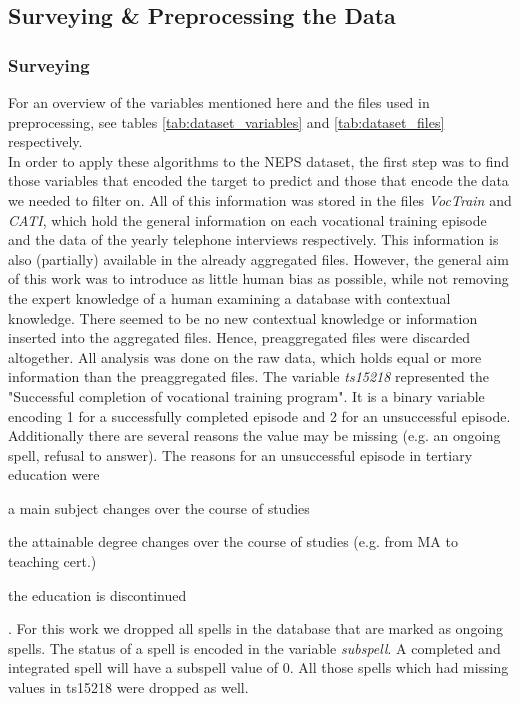 \FloatBarrier
\subsection{Surveying \& Preprocessing the Data}
\FloatBarrier
\label{sec:preprocessing}
\subsubsection{Surveying}

For an overview of the variables mentioned here and the files used in preprocessing, see tables \ref{tab:dataset_variables} and \ref{tab:dataset_files} respectively.\\
In order to apply these algorithms to the NEPS dataset, the first step was to find those variables that encoded the target to predict and those that encode the data we needed to filter on. All of this information was stored in the files \textit{VocTrain} and \textit{CATI}, which hold the general information on each vocational training episode and the data of the yearly telephone interviews respectively. This information is also (partially) available in the already aggregated files. However, the general aim of this work was to introduce as little human bias as possible, while not removing the expert knowledge of a human examining a database with contextual knowledge. There seemed to be no new contextual knowledge or information inserted into the aggregated files. Hence, preaggregated files were discarded altogether. All analysis was done on the raw data, which holds equal or more information than the preaggregated files.
The variable \textit{ts15218} represented the "Successful completion of vocational training program". It is a binary variable encoding 1 for a successfully completed episode and 2 for an unsuccessful episode. Additionally there are several reasons the value may be missing (e.g. an ongoing spell, refusal to answer). The reasons for an unsuccessful episode in tertiary education were
\begin{enumerate*}[label=\alph*)]
    \item a main subject changes over the course of studies
    \item the attainable degree changes over the course of studies (e.g. from MA to teaching cert.)
    \item the education is discontinued
\end{enumerate*}.
For this work we dropped all spells in the database that are marked as ongoing spells. The status of a spell is encoded in the variable \textit{subspell}. A completed and integrated spell will have a subspell value of 0. All those spells which had missing values in ts15218 were dropped as well.

